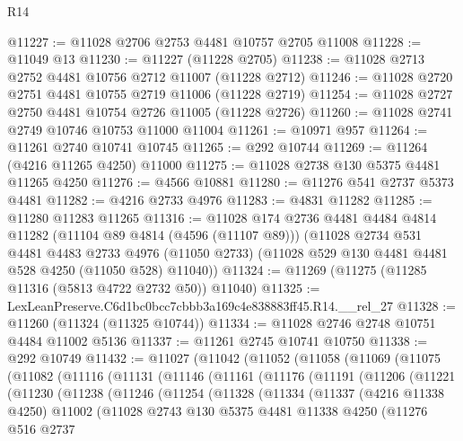 \begin{lexlean}{R14}
\begin{coremodule}
@11227 := @11028 @2706 @2753 @4481 @10757 @2705 @11008
@11228 := @11049 @13
@11230 := @11227 (@11228 @2705)
@11238 := @11028 @2713 @2752 @4481 @10756 @2712 @11007 (@11228 @2712)
@11246 := @11028 @2720 @2751 @4481 @10755 @2719 @11006 (@11228 @2719)
@11254 := @11028 @2727 @2750 @4481 @10754 @2726 @11005 (@11228 @2726)
@11260 := @11028 @2741 @2749 @10746 @10753 @11000 @11004
@11261 := @10971 @957
@11264 := @11261 @2740 @10741 @10745
@11265 := @292 @10744
@11269 := @11264 (@4216 @11265 @4250) @11000
@11275 := @11028 @2738 @130 @5375 @4481 @11265 @4250
@11276 := @4566 @10881
@11280 := @11276 @541 @2737 @5373 @4481
@11282 := @4216 @2733 @4976
@11283 := @4831 @11282
@11285 := @11280 @11283 @11265
@11316 := @11028
    @174
    @2736
    @4481
    @4484
    @4814
    @11282
    (@11104 @89 @4814 (@4596 (@11107 @89)))
    (@11028
      @2734
      @531
      @4481
      @4483
      @2733
      @4976
      (@11050 @2733)
      (@11028 @529 @130 @4481 @4481 @528 @4250 (@11050 @528) @11040))
@11324 := @11269 (@11275 (@11285 @11316 (@5813 @4722 @2732 @50)) @11040)
@11325 := LexLeanPreserve.C6d1bc0bcc7cbbb3a169c4e838883ff45.R14.__rel_27
@11328 := @11260 (@11324 (@11325 @10744))
@11334 := @11028 @2746 @2748 @10751 @4484 @11002 @5136
@11337 := @11261 @2745 @10741 @10750
@11338 := @292 @10749
@11432 := @11027
    (@11042
      (@11052
        (@11058
          (@11069
            (@11075
              (@11082
                (@11116
                  (@11131
                    (@11146
                      (@11161
                        (@11176
                          (@11191
                            (@11206
                              (@11221
                                (@11230
                                  (@11238
                                    (@11246
                                      (@11254
                                        (@11328
                                          (@11334
                                            (@11337
                                              (@4216 @11338 @4250)
                                              @11002
                                              (@11028
                                                @2743
                                                @130
                                                @5375
                                                @4481
                                                @11338
                                                @4250
                                                (@11276
                                                  @516
                                                  @2737

\end{coremodule}
\end{lexlean}

